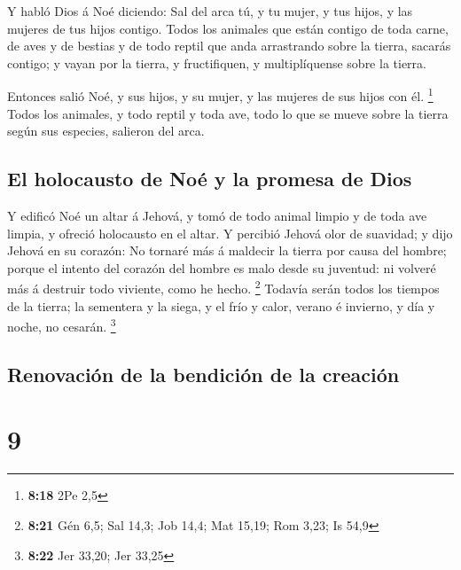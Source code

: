  Y habló Dios á Noé diciendo:  Sal del
arca tú, y tu mujer, y tus hijos, y las mujeres de tus hijos contigo.
 Todos los animales que están contigo de toda carne, de
aves y de bestias y de todo reptil que anda arrastrando sobre la tierra,
sacarás contigo; y vayan por la tierra, y fructifiquen, y multiplíquense
sobre la tierra.

 Entonces salió Noé, y sus hijos, y su mujer, y las
mujeres de sus hijos con él. \footnote{\textbf{8:18} 2Pe 2,5}
 Todos los animales, y todo reptil y toda ave, todo lo
que se mueve sobre la tierra según sus especies, salieron del arca.

\hypertarget{el-holocausto-de-nouxe9-y-la-promesa-de-dios}{%
\subsection{El holocausto de Noé y la promesa de
Dios}\label{el-holocausto-de-nouxe9-y-la-promesa-de-dios}}

 Y edificó Noé un altar á Jehová, y tomó de todo animal
limpio y de toda ave limpia, y ofreció holocausto en el altar.
 Y percibió Jehová olor de suavidad; y dijo Jehová en su
corazón: No tornaré más á maldecir la tierra por causa del hombre;
porque el intento del corazón del hombre es malo desde su juventud: ni
volveré más á destruir todo viviente, como he hecho. \footnote{\textbf{8:21}
  Gén 6,5; Sal 14,3; Job 14,4; Mat 15,19; Rom 3,23; Is 54,9}
 Todavía serán todos los tiempos de la tierra; la
sementera y la siega, y el frío y calor, verano é invierno, y día y
noche, no cesarán. \footnote{\textbf{8:22} Jer 33,20; Jer 33,25}

\hypertarget{renovaciuxf3n-de-la-bendiciuxf3n-de-la-creaciuxf3n}{%
\subsection{Renovación de la bendición de la
creación}\label{renovaciuxf3n-de-la-bendiciuxf3n-de-la-creaciuxf3n}}

\hypertarget{section-8}{%
\section{9}\label{section-8}}

